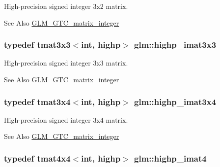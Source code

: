 High-\/precision signed integer 3x2 matrix. \begin{DoxySeeAlso}{See Also}
\hyperlink{group__gtc__matrix__integer}{G\-L\-M\-\_\-\-G\-T\-C\-\_\-matrix\-\_\-integer} 
\end{DoxySeeAlso}
\hypertarget{group__gtc__matrix__integer_gaecb62c11fb25aadbb7eecc2da226d444}{
\subsubsection[{highp\-\_\-imat3x3}]{\setlength{\rightskip}{0pt plus 5cm}typedef tmat3x3$<$int, highp$>$ {\bf glm\-::highp\-\_\-imat3x3}}}\label{group__gtc__matrix__integer_gaecb62c11fb25aadbb7eecc2da226d444}
High-\/precision signed integer 3x3 matrix. \begin{DoxySeeAlso}{See Also}
\hyperlink{group__gtc__matrix__integer}{G\-L\-M\-\_\-\-G\-T\-C\-\_\-matrix\-\_\-integer} 
\end{DoxySeeAlso}
\hypertarget{group__gtc__matrix__integer_gabcd2d8d764b11db413259ee5cafd8446}{
\subsubsection[{highp\-\_\-imat3x4}]{\setlength{\rightskip}{0pt plus 5cm}typedef tmat3x4$<$int, highp$>$ {\bf glm\-::highp\-\_\-imat3x4}}}\label{group__gtc__matrix__integer_gabcd2d8d764b11db413259ee5cafd8446}
High-\/precision signed integer 3x4 matrix. \begin{DoxySeeAlso}{See Also}
\hyperlink{group__gtc__matrix__integer}{G\-L\-M\-\_\-\-G\-T\-C\-\_\-matrix\-\_\-integer} 
\end{DoxySeeAlso}
\hypertarget{group__gtc__matrix__integer_gaa5eedcb20883541c3f7f2862cbd0b446}{
\subsubsection[{highp\-\_\-imat4}]{\setlength{\rightskip}{0pt plus 5cm}typedef tmat4x4$<$int, highp$>$ {\bf glm\-::highp\-\_\-imat4}}}\label{group__gtc__matrix__integer_gaa5eedcb20883541c3f7f2862cbd0b446}
